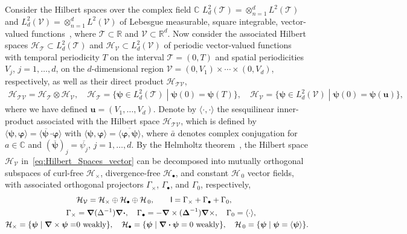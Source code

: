 \documentclass[leqno,onefignum,onetabnum]{siamltex1213}
\newcommand{\Tc}{\mathcal{T}}
\newcommand{\Vc}{\mathcal{V}}
\newcommand{\Hc}{\mathcal{H}}
\newcommand{\Ib}{\mathsf{I}}
\newcommand\bDelta{\mbox{\boldmath${\Delta}$}}
\newcommand\bnabla{\mbox{\boldmath${\nabla}$}}
\providecommand\bcdot{\boldsymbol{\cdot}}
\newcommand{\vecu}{\boldsymbol{u}}
\newcommand{\vecpsi}{\boldsymbol{\psi}}
\newcommand{\vecvarphi}{\boldsymbol{\varphi}}
\begin{document}
Consider the Hilbert spaces over the complex field $\mathbb{C}$
$L^2_d(\Tc)=\otimes_{n=1}^dL^2(\Tc)$ and
$L^2_d(\Vc)=\otimes_{n=1}^dL^2(\Vc)$ 
of Lebesgue measurable, square integrable, vector-valued
functions~\cite{Folland:99}, where $\Tc\subset\mathbb{R}$ and
$\Vc\subset\mathbb{R}^d$. Now  
consider the associated Hilbert spaces $\Hc_{\Tc}\subset L^2_d(\Tc)$ and
$\Hc_{\Vc}\subset L^2_d(\Vc)$ of periodic vector-valued functions with
temporal periodicity $T$ on the interval $\Tc=(0,T)$ and spatial
periodicities $V_j$, $j=1,\ldots,d$, on the $d$-dimensional region
$\Vc=(0,V_1)\times\cdots\times(0,V_d)$, respectively, as well as their direct product 
$\Hc_{\Tc\Vc}$,
%
\begin{align}%
  \Hc_{\Tc\Vc}=\Hc_{\Tc}\otimes\Hc_{\Vc}, \quad
  \Hc_{\Tc}=\{ 
     \vecpsi\in L^2_d(\Tc)\;|\;
     \vecpsi(0)=\vecpsi(T) 
                        \}, \quad
  \Hc_{\Vc}=\{ 
     \vecpsi\in L^2_d(\Vc)\;|\;
     \vecpsi(0)=\vecpsi(\vecu ) 
                        \}, 
\end{align}
%
where we have defined $\vecu =(V_1,\ldots,V_d)$. Denote by $\langle\cdot,\cdot\rangle$ the
sesquilinear inner-product associated with the Hilbert space
$\Hc_{\Tc\Vc}$, which is defined by
$\langle\vecpsi,\vecvarphi\rangle=\langle\overline{\vecpsi\,}\bcdot\vecvarphi\rangle$  with 
$\langle\vecpsi,\vecvarphi\rangle=\overline{\langle\vecvarphi,\vecpsi\rangle}$, where $\bar{a}$ 
denotes complex conjugation for $a\in\mathbb{C}$ and
$(\overline{\vecpsi})_j=\overline{\psi_j}$, $j=1,\ldots,d$. By the Helmholtz
theorem~\cite{Denaro:2003:0271,Bhatia:IEE:1077}, the Hilbert space
$\Hc_{\Vc}$ in~\eqref{eq:Hilbert_Spaces_vector} can be decomposed into
mutually orthogonal subspaces of curl-free $\Hc_\times$, divergence-free
$\Hc_\bullet$, and constant $\Hc_{\,0}$ vector fields, with associated
orthogonal projectors $\Gamma_\times$, $\Gamma_\bullet$, and $\Gamma_0$,
respectively,~\cite{Fannjiang:SIAM_JAM:333,MILTON:2002:TC}    
%
\begin{align}%
  &\Hc_{\Vc}=\Hc_\times\oplus\Hc_\bullet\oplus\Hc_{\,0},\qquad
  \Ib=\Gamma_\times+\Gamma_\bullet+\Gamma_0, \\
  \Gamma_\times&=\bnabla (\Delta^{-1})\bnabla \bcdot, \quad
  \Gamma_\bullet=-\bnabla \times(\bDelta^{-1})\bnabla \times, \quad
  \Gamma_0=\langle\cdot\rangle, \quad
  \notag \\
  \Hc_\times=\{\vecpsi\;|\;\bnabla \times\vecpsi=&0 \text{ weakly}\}, \quad
  \Hc_\bullet
      =\{\vecpsi\;|\;\bnabla \bcdot\vecpsi=0 \text{ weakly}\},   \quad
  \Hc_{\,0}
      =\{\vecpsi\;|\;\vecpsi=\langle\vecpsi\rangle\}.
     \notag  
\end{align}
%
\end{document}
